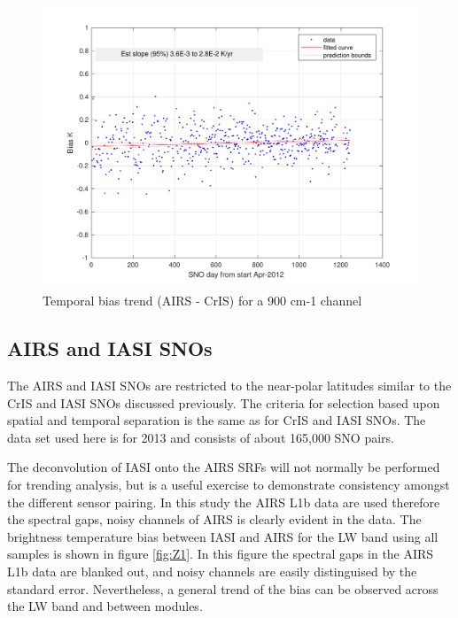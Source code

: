 \documentclass[twocolumn,10pt]{article}
\begin{document}
\begin{figure}[htb]
\centering
\includegraphics[width=\linewidth]{./figs/AC_aslSNO_900wn_biasTrend_screened.pdf}
\caption{\label{fig:orgparagraph18}
  Temporal bias trend (AIRS - CrIS) for a 900 cm-1 channel}
\label{fig:Y9}
\end{figure}


\subsection{AIRS and IASI SNOs}
\label{sec:orgheadline10}
The AIRS and IASI SNOs are restricted to the near-polar latitudes similar to the 
CrIS and IASI SNOs discussed previously. The criteria for selection based upon spatial and temporal separation is the same as for CrIS and IASI SNOs. The data set used here is for 2013 and consists of about 165,000 SNO pairs. 

The deconvolution of IASI onto the AIRS SRFs will not normally be performed for trending analysis, but is a useful exercise to demonstrate consistency amongst the different sensor pairing. In this study the AIRS L1b data are used therefore the spectral gaps, noisy channels of AIRS is clearly evident in the data. The
brightness temperature bias between IASI and AIRS for the LW band using all samples is shown in figure \ref{fig:Z1}. In this figure the spectral gaps in the AIRS L1b data are blanked out, and noisy channels are easily distinguised by the standard error. Nevertheless, a general trend of the bias can be observed across the LW band and between modules.
\end{document}
